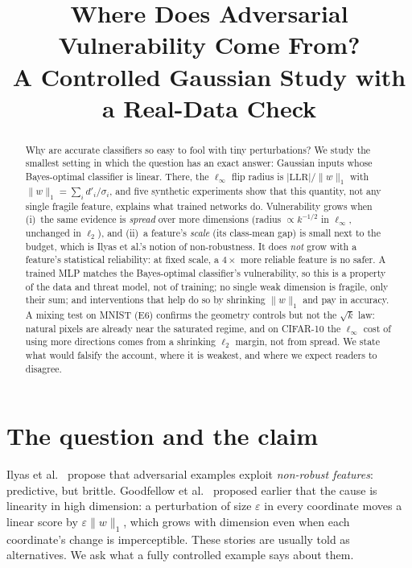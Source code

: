 \documentclass[11pt]{article}
\title{Where Does Adversarial Vulnerability Come From?\\
A Controlled Gaussian Study with a Real-Data Check}
\author{}
\date{}
\newcommand{\linf}{\ell_\infty}
\newcommand{\ltwo}{\ell_2}
\begin{document}
\sloppy
\maketitle

\begin{abstract}
Why are accurate classifiers so easy to fool with tiny perturbations? We study
the smallest setting in which the question has an exact answer: Gaussian
inputs whose Bayes-optimal classifier is linear. There, the $\ell_\infty$
flip radius is $|\mathrm{LLR}|/\|w\|_1$ with $\|w\|_1=\sum_i d'_i/\sigma_i$, and
five synthetic experiments show that this quantity, not any single fragile feature,
explains what trained networks do. Vulnerability grows when
(i)~the same evidence is \emph{spread} over more dimensions
(radius $\propto k^{-1/2}$ in $\ell_\infty$, unchanged in $\ell_2$), and
(ii)~a feature's \emph{scale} (its class-mean gap) is small next to the budget,
which is Ilyas et al.'s notion of non-robustness. It does \emph{not} grow with
a feature's statistical reliability: at fixed scale, a $4\times$ more reliable
feature is no safer. A trained MLP matches the Bayes-optimal classifier's
vulnerability, so this is a property of the data and threat model, not of
training; no single weak dimension is fragile, only their sum; and
interventions that help do so by shrinking $\|w\|_1$ and pay in accuracy. A mixing test on MNIST (E6) confirms the geometry controls but not the $\sqrt k$ law: natural pixels are already near the saturated regime, and on CIFAR-10 the $\linf$ cost of using more directions comes from a shrinking $\ltwo$ margin, not from spread. We
state what would falsify the account, where it is weakest, and where we expect
readers to disagree.
\end{abstract}

\section{The question and the claim}

Ilyas et al.~\cite{ilyas2019} propose that adversarial examples exploit
\emph{non-robust features}: predictive, but brittle. Goodfellow et
al.~\cite{goodfellow2015} proposed earlier that the cause is linearity in high
dimension: a perturbation of size $\varepsilon$ in every coordinate moves a
linear score by $\varepsilon\|w\|_1$, which grows with dimension even when each
coordinate's change is imperceptible. These stories are usually told as
alternatives. We ask what a fully controlled example says about them.
\end{document}
